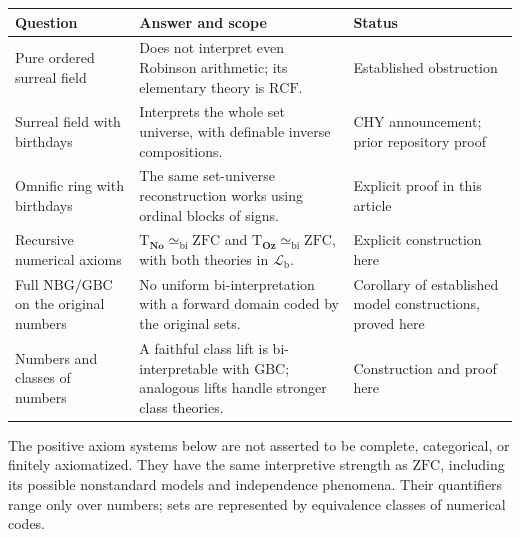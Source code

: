 \documentclass[11pt,letterpaper]{article}
\theoremstyle{definition}
\theoremstyle{remark}
\newcommand{\No}{\mathbf{No}}
\newcommand{\ZFC}{\mathrm{ZFC}}
\newcommand{\Oz}{\mathbf{Oz}}
\newcommand{\GBC}{\mathrm{GBC}}
\newcommand{\NBG}{\mathrm{NBG}}
\newcommand{\RCF}{\mathrm{RCF}}
\newcommand{\Lb}{\mathcal L_{\mathrm b}}
\newcommand{\Tth}{\mathrm{T}}
\newcommand{\bi}{\simeq_{\mathrm{bi}}}
\begin{document}
\begin{center}
\small
\begin{tabularx}{\textwidth}{@{}P{0.27\textwidth}YP{0.23\textwidth}@{}}
\toprule
Question & Answer and scope & Status\\
\midrule
Pure ordered surreal field & Does not interpret even Robinson arithmetic; its
elementary theory is $\RCF$. & Established obstruction\\
Surreal field with birthdays & Interprets the whole set universe, with definable
inverse compositions. & CHY announcement; prior repository proof\\
Omnific ring with birthdays & The same set-universe reconstruction works using
ordinal blocks of signs. & Explicit proof in this article\\
Recursive numerical axioms & $\Tth_{\No}\bi\ZFC$ and $\Tth_{\Oz}\bi\ZFC$, with
both theories in $\Lb$. & Explicit construction here\\
Full $\NBG/\GBC$ on the original numbers & No uniform bi-interpretation with a
forward domain coded by the original sets. & Corollary of established model
constructions, proved here\\
Numbers and classes of numbers & A faithful class lift is bi-interpretable with
$\GBC$; analogous lifts handle stronger class theories. & Construction and proof
here\\
\bottomrule
\end{tabularx}
\end{center}

The positive axiom systems below are not asserted to be complete, categorical,
or finitely axiomatized. They have the same interpretive strength as $\ZFC$,
including its possible nonstandard models and independence phenomena. Their
quantifiers range only over numbers; sets are represented by equivalence classes
of numerical codes.
\end{document}
